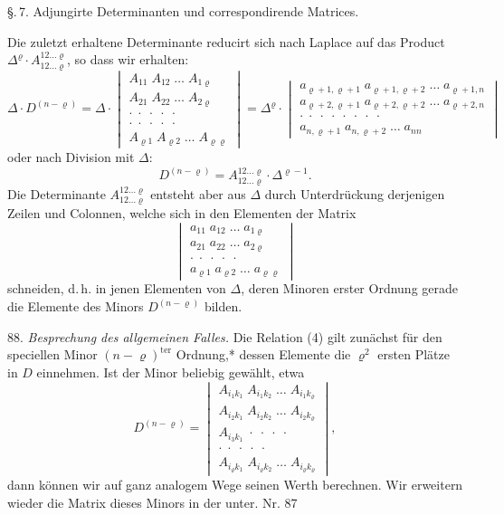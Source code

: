 \documentclass[11pt]{article}
\providecommand{\weberpage}[1]{}
\providecommand{\weq}[2]{\begin{equation}\tag{#1}#2\end{equation}}
\let\Delta\varDelta
\begin{document}
\weberpage{91}
\S.\,7. Adjungirte Determinanten und correspondirende Matrices.

Die zuletzt erhaltene Determinante reducirt sich nach Laplace auf das Product $\Delta^\varrho\cdot A^{12\ldots\varrho}_{12\ldots\varrho}$, so dass wir erhalten:
\weq{3}{\Delta\cdot D^{(n-\varrho)}=\Delta\cdot
\begin{vmatrix}
A_{11}\;A_{12}\;\ldots\;A_{1\varrho} \\
A_{21}\;A_{22}\;\ldots\;A_{2\varrho} \\
\cdot\;\cdot\;\cdot\;\cdot\;\cdot \\
\cdot\;\cdot\;\cdot\;\cdot\;\cdot \\
A_{\varrho 1}\;A_{\varrho 2}\;\ldots\;A_{\varrho\varrho}
\end{vmatrix}
=\Delta^\varrho\cdot
\begin{vmatrix}
a_{\varrho+1,\varrho+1}\;a_{\varrho+1,\varrho+2}\;\ldots\;a_{\varrho+1,n} \\
a_{\varrho+2,\varrho+1}\;a_{\varrho+2,\varrho+2}\;\ldots\;a_{\varrho+2,n} \\
\cdot\;\cdot\;\cdot\;\cdot\;\cdot\;\cdot\;\cdot\;\cdot \\
a_{n,\varrho+1}\;a_{n,\varrho+2}\;\ldots\;a_{nn}
\end{vmatrix}}
oder nach Division mit $\Delta$:
\weq{4}{D^{(n-\varrho)}=A^{12\ldots\varrho}_{12\ldots\varrho}\cdot\Delta^{\varrho-1}.}
Die Determinante $A^{12\ldots\varrho}_{12\ldots\varrho}$ entsteht aber aus $\Delta$ durch Unterdrückung derjenigen Zeilen und Colonnen, welche sich in den Elementen der Matrix
\[
\begin{vmatrix}
a_{11}\;a_{12}\;\ldots\;a_{1\varrho} \\
a_{21}\;a_{22}\;\ldots\;a_{2\varrho} \\
\cdot\;\cdot\;\cdot\;\cdot\;\cdot \\
a_{\varrho 1}\;a_{\varrho 2}\;\ldots\;a_{\varrho\varrho}
\end{vmatrix}
\]
schneiden, d.\,h. in jenen Elementen von $\Delta$, deren Minoren erster Ordnung gerade die Elemente des Minors $D^{(n-\varrho)}$ bilden.

88. \textit{Besprechung des allgemeinen Falles.} Die Relation (4) gilt zunächst für den speciellen Minor $(n-\varrho)^{\text{ter}}$ Ordnung,* dessen Elemente die $\varrho^2$ ersten Plätze in $D$ einnehmen.
Ist der Minor beliebig gewählt, etwa
\[
D^{(n-\varrho)}=
\begin{vmatrix}
A_{i_1k_1}\;A_{i_1k_2}\;\ldots\;A_{i_1k_\varrho} \\
A_{i_2k_1}\;A_{i_2k_2}\;\ldots\;A_{i_2k_\varrho} \\
A_{i_3k_1}\;\cdot\;\cdot\;\cdot\;\cdot \\
\cdot\;\cdot\;\cdot\;\cdot\;\cdot \\
A_{i_\varrho k_1}\;A_{i_\varrho k_2}\;\ldots\;A_{i_\varrho k_\varrho}
\end{vmatrix},
\]
dann können wir auf ganz analogem Wege seinen Werth berechnen. Wir erweitern wieder die Matrix dieses Minors in der unter. Nr. 87 %
\end{document}
